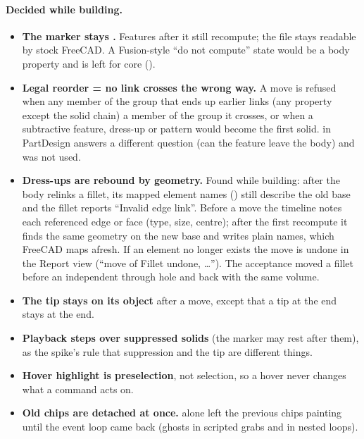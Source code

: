 \paragraph{Decided while building.}
\begin{itemize}[nosep]
  \item \textbf{The marker stays .} Features after it still recompute; the file stays readable by
        stock FreeCAD. A Fusion-style ``do not compute'' state would be a body property and is left for core
        ().
  \item \textbf{Legal reorder = no link crosses the wrong way.} A move is refused when any member of the group
        that ends up earlier links (any property except the solid chain) a member of the group it crosses, or when a
        subtractive feature, dress-up or pattern would become the first solid.  in
        PartDesign answers a different question (can the feature leave the body) and was not used.
  \item \textbf{Dress-ups are rebound by geometry.} Found while building: after the body relinks a fillet, its
        mapped element names () still describe the old base and the fillet reports
        ``Invalid edge link''. Before a move the timeline notes each referenced edge or face (type, size, centre);
        after the first recompute it finds the same geometry on the new base and writes plain names, which FreeCAD
        maps afresh. If an element no longer exists the move is undone in the Report view (``move of Fillet
        undone, \ldots''). The acceptance moved a fillet before an independent through hole and back with the same
        volume.
  \item \textbf{The tip stays on its object} after a move, except that a tip at the end stays at the end.
  \item \textbf{Playback steps over suppressed solids} (the marker may rest after them), as the spike's rule that
        suppression and the tip are different things.
  \item \textbf{Hover highlight is preselection}, not selection, so a hover never changes what a command acts on.
  \item \textbf{Old chips are detached at once.}  alone left the previous chips painting until
        the event loop came back (ghosts in scripted grabs and in nested loops).
\end{itemize}

